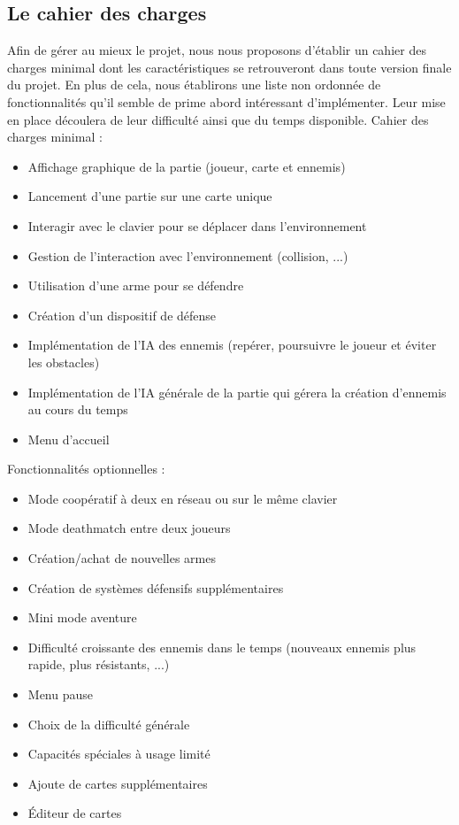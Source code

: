 \subsection{Le cahier des charges}

Afin de gérer au mieux le projet, nous nous proposons d’établir un cahier des charges minimal dont les
caractéristiques se retrouveront dans toute version finale du projet. En plus de cela, nous établirons une liste
non ordonnée de fonctionnalités qu’il semble de prime abord intéressant d’implémenter. Leur mise en place
découlera de leur difficulté ainsi que du temps disponible.
Cahier des charges minimal :
\begin{itemize}
\item Affichage graphique de la partie (joueur, carte et ennemis)
\item Lancement d’une partie sur une carte unique
\item Interagir avec le clavier pour se déplacer dans l’environnement
\item Gestion de l’interaction avec l’environnement (collision, ...)
\item Utilisation d’une arme pour se défendre
\item Création d’un dispositif de défense
\item Implémentation de l’IA des ennemis (repérer, poursuivre le joueur et éviter les obstacles)
\item Implémentation de l’IA générale de la partie qui gérera la création d’ennemis au cours du temps
\item Menu d’accueil
\end{itemize}
Fonctionnalités optionnelles :
\begin{itemize}
\item Mode coopératif à deux en réseau ou sur le même clavier
\item Mode deathmatch entre deux joueurs
\item Création/achat de nouvelles armes
\item Création de systèmes défensifs supplémentaires
\item Mini mode aventure
\item Difficulté croissante des ennemis dans le temps (nouveaux ennemis plus rapide, plus résistants, ...)
\item Menu pause
\item Choix de la difficulté générale
\item Capacités spéciales à usage limité
\item Ajoute de cartes supplémentaires
\item Éditeur de cartes
\end{itemize}